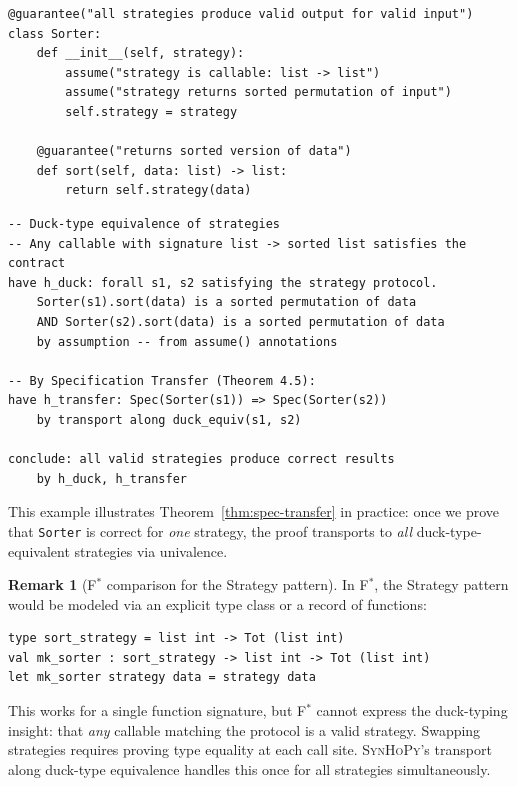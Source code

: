\documentclass[11pt,a4paper]{report}
\theoremstyle{definition}
\newtheorem{remark}[definition]{Remark}
\theoremstyle{plain}
\newcommand{\fstar}{F$^{*}$}
\newcommand{\synhopy}{\textsc{SynHoPy}}
\begin{document}
\begin{lstlisting}[style=synhopy]
@guarantee("all strategies produce valid output for valid input")
class Sorter:
    def __init__(self, strategy):
        assume("strategy is callable: list -> list")
        assume("strategy returns sorted permutation of input")
        self.strategy = strategy

    @guarantee("returns sorted version of data")
    def sort(self, data: list) -> list:
        return self.strategy(data)
\end{lstlisting}

\begin{lstlisting}[style=proof]
-- Duck-type equivalence of strategies
-- Any callable with signature list -> sorted list satisfies the contract
have h_duck: forall s1, s2 satisfying the strategy protocol.
    Sorter(s1).sort(data) is a sorted permutation of data
    AND Sorter(s2).sort(data) is a sorted permutation of data
    by assumption -- from assume() annotations

-- By Specification Transfer (Theorem 4.5):
have h_transfer: Spec(Sorter(s1)) => Spec(Sorter(s2))
    by transport along duck_equiv(s1, s2)

conclude: all valid strategies produce correct results
    by h_duck, h_transfer
\end{lstlisting}

This example illustrates Theorem~\ref{thm:spec-transfer} in practice: once
we prove that \texttt{Sorter} is correct for \emph{one} strategy, the proof
transports to \emph{all} duck-type-equivalent strategies via univalence.

\begin{remark}[\fstar{} comparison for the Strategy pattern]
In \fstar{}, the Strategy pattern would be modeled via an explicit type class
or a record of functions:
\begin{lstlisting}[style=fstar]
type sort_strategy = list int -> Tot (list int)
val mk_sorter : sort_strategy -> list int -> Tot (list int)
let mk_sorter strategy data = strategy data
\end{lstlisting}
This works for a single function signature, but \fstar{} cannot express
the duck-typing insight: that \emph{any} callable matching the protocol
is a valid strategy.  Swapping strategies requires proving type equality
at each call site.  \synhopy{}'s transport along duck-type equivalence
handles this once for all strategies simultaneously.
\end{remark}
\end{document}
